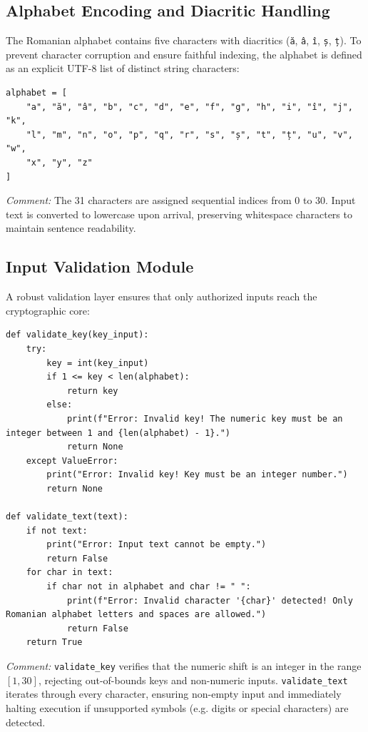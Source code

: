 \documentclass{labreport}
\begin{document}
\subsection{Alphabet Encoding and Diacritic Handling}
The Romanian alphabet contains five characters with diacritics (\texttt{ă}, \texttt{â}, \texttt{î}, \texttt{ș}, \texttt{ț}). To prevent character corruption and ensure faithful indexing, the alphabet is defined as an explicit UTF-8 list of distinct string characters:

\begin{lstlisting}[style=python]
alphabet = [
    "a", "ă", "â", "b", "c", "d", "e", "f", "g", "h", "i", "î", "j", "k",
    "l", "m", "n", "o", "p", "q", "r", "s", "ș", "t", "ț", "u", "v", "w",
    "x", "y", "z"
]
\end{lstlisting}
\textit{Comment:} The 31 characters are assigned sequential indices from $0$ to $30$. Input text is converted to lowercase upon arrival, preserving whitespace characters to maintain sentence readability.

\subsection{Input Validation Module}
A robust validation layer ensures that only authorized inputs reach the cryptographic core:

\begin{lstlisting}[style=python]
def validate_key(key_input):
    try:
        key = int(key_input)
        if 1 <= key < len(alphabet):
            return key
        else:
            print(f"Error: Invalid key! The numeric key must be an integer between 1 and {len(alphabet) - 1}.")
            return None
    except ValueError:
        print("Error: Invalid key! Key must be an integer number.")
        return None

def validate_text(text):
    if not text:
        print("Error: Input text cannot be empty.")
        return False
    for char in text:
        if char not in alphabet and char != " ":
            print(f"Error: Invalid character '{char}' detected! Only Romanian alphabet letters and spaces are allowed.")
            return False
    return True
\end{lstlisting}
\textit{Comment:} \texttt{validate\_key} verifies that the numeric shift is an integer in the range $[1, 30]$, rejecting out-of-bounds keys and non-numeric inputs. \texttt{validate\_text} iterates through every character, ensuring non-empty input and immediately halting execution if unsupported symbols (e.g. digits or special characters) are detected.
\end{document}

